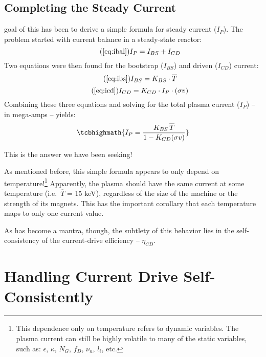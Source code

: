 \subsection{Completing the Steady Current}

 goal of this  has been to derive a simple formula for steady current ($I_P$). The problem started with current balance in a steady-state reactor:
\begin{equation}
	\tag{\ref{eq:ibal}}
	I_P = I_{BS} + I_{CD}
\end{equation}
Two equations were then found for the bootstrap ($I_{BS}$) and driven ($I_{CD}$) current:
\begin{equation}
	\tag{\ref{eq:ibs}}
	I_{BS} = K_{BS} \cdot \overline T
\end{equation}
\begin{equation}
	\tag{\ref{eq:icd}}
	I_{CD} = K_{CD} \cdot I_P \cdot ( \sigma v )
\end{equation}
Combining these three equations and solving for the total plasma current ($I_P$) -- in mega-amps -- yields:
\begin{equation}
	\label{eq:steady}
	\tcbhighmath{
	I_P = \frac{ K_{BS} \, \overline T }{ 1 - K_{CD} ( \sigma v ) }
	}
\end{equation}

This is the answer we have been seeking!

As mentioned before, this simple formula appears to only depend on temperature!\footnote{ This dependence only on temperature refers to dynamic variables. The plasma current can still be highly volatile to many of the static variables, such as: $\epsilon$, $\kappa$, $N_G$, $f_D$, $\nu_n$, $l_i$, etc. } Apparently, the plasma should have the same current at some temperature (i.e.\ $\overline T$ = 15 keV), regardless of the size of the machine or the strength of its magnets. This has the important corollary that each temperature maps to only one current value. 

As has become a mantra, though, the subtlety of this behavior lies in the self-consistency of the current-drive efficiency -- $\eta_{CD}$.

\section{Handling Current Drive Self-Consistently}

